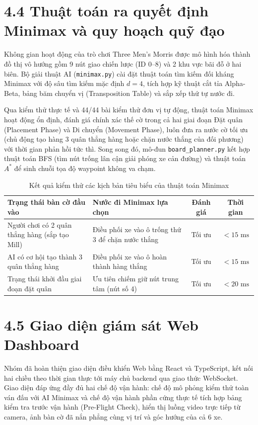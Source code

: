 \documentclass[14pt,a4paper]{extreport}
\begin{document}
\section*{4.4 Thuật toán ra quyết định Minimax và quy hoạch quỹ đạo}
Không gian hoạt động của trò chơi Three Men's Morris được mô hình hóa thành đồ thị vô hướng gồm 9 nút giao chiến lược (ID 0--8) và 2 khu vực bãi đỗ ở hai biên. Bộ giải thuật AI (\texttt{minimax.py}) cài đặt thuật toán tìm kiếm đối kháng Minimax với độ sâu tìm kiếm mặc định $d = 4$, tích hợp kỹ thuật cắt tỉa Alpha-Beta, bảng băm chuyển vị (Transposition Table) và sắp xếp thứ tự nước đi.

Qua kiểm thử thực tế và 44/44 bài kiểm thử đơn vị tự động, thuật toán Minimax hoạt động ổn định, đánh giá chính xác thế cờ trong cả hai giai đoạn Đặt quân (Placement Phase) và Di chuyển (Movement Phase), luôn đưa ra nước cờ tối ưu (chủ động tạo hàng 3 quân thẳng hàng hoặc chặn nước thắng của đối phương) với thời gian phản hồi tức thì. Song song đó, mô-đun \texttt{board\_planner.py} kết hợp thuật toán BFS (tìm nút trống lân cận giải phóng xe cản đường) và thuật toán $A^*$ để sinh chuỗi tọa độ waypoint không va chạm.
 
\begin{table}[H]
\centering
\caption{Kết quả kiểm thử các kịch bản tiêu biểu của thuật toán Minimax}
\begin{tabular}{L{4.5cm} L{4.5cm} c c}
\toprule
\textbf{Trạng thái bàn cờ đầu vào} & \textbf{Nước đi Minimax lựa chọn} & \textbf{Đánh giá} & \textbf{Thời gian} \\
\midrule
Người chơi có 2 quân thẳng hàng (sắp tạo Mill) & Điều phối xe vào ô trống thứ 3 để chặn nước thắng & Tối ưu & $< 15\text{ ms}$ \\
AI có cơ hội tạo thành 3 quân thẳng hàng & Điều phối xe vào ô hoàn thành hàng thắng & Tối ưu & $< 15\text{ ms}$ \\
Trạng thái khởi đầu giai đoạn đặt quân & Ưu tiên chiếm giữ nút trung tâm (nút số 4) & Tối ưu & $< 20\text{ ms}$ \\
\bottomrule
\end{tabular}
\end{table}
 
\section*{4.5 Giao diện giám sát Web Dashboard}
Nhóm đã hoàn thiện giao diện điều khiển Web bằng React và TypeScript, kết nối hai chiều theo thời gian thực tới máy chủ backend qua giao thức WebSocket. Giao diện đáp ứng đầy đủ hai chế độ vận hành: chế độ mô phỏng kiểm thử toàn ván đấu với AI Minimax và chế độ vận hành phần cứng thực tế tích hợp bảng kiểm tra trước vận hành (Pre-Flight Check), hiển thị luồng video trực tiếp từ camera, ảnh bàn cờ đã nắn phẳng cùng vị trí và góc hướng của cả 6 xe.
 
\end{document}
